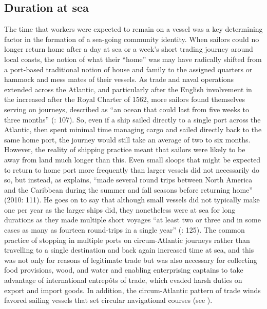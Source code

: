 \subsection{{Duration at sea}}\label{sec:4.2.1}
\largerpage
The time that workers were expected to remain on a vessel was a key determining factor in the formation of a sea-going community identity. When sailors could no longer return home after a day at sea or a week’s short trading journey around local coasts, the notion of what their “home” was may have radically shifted from a port-based traditional notion of house and family to the assigned quarters or hammock and mess mates of their vessels. As trade and naval operations extended across the Atlantic, and particularly after the English involvement in the  increased after the Royal Charter of 1562, more sailors found themselves serving on  journeys, described as “an ocean  that could last from five weeks to three months” (\citealt{Brown2011}: 107). So, even if a ship sailed directly to a single port across the Atlantic, then spent minimal time managing cargo and sailed directly back to the same home port, the journey would still take an average of two to six months. However, the reality of shipping practice meant that sailors were likely to be away from land much longer than this. Even small sloops that might be expected to return to home port more frequently than larger vessels did not necessarily do so, but instead, as \citeauthor{Jarvis2010} explains, “made several round trips between North America and the Caribbean during the summer and fall seasons before returning home” (2010: 111).  He goes on to say that although small vessels did not typically make one   per year as the larger ships did, they nonetheless were at sea for long durations as they made multiple short voyages “at least two or three and in some cases as many as fourteen round-trips in a single year” (\citealt{Jarvis2010}: 125). The common practice of stopping in multiple ports on circum-Atlantic journeys rather than travelling to a single destination and back again increased time at sea, and this was not only for reasons of legitimate trade but was also necessary for collecting food provisions, wood, and water and enabling enterprising captains to take advantage of international entrepôts of trade, which evaded harsh duties on export and import goods. In addition, the circum-Atlantic pattern of trade winds favored sailing vessels that set circular navigational courses (see ). 

